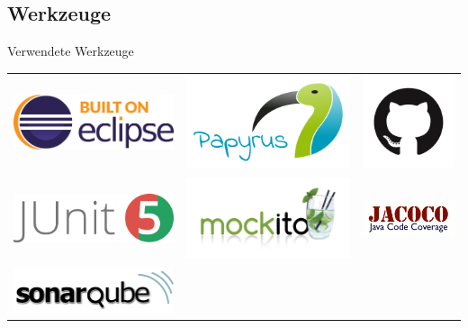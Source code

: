 \documentclass[18pt]{beamer}
\begin{document}
\subsection{Werkzeuge}
\begin{frame}{Verwendete Werkzeuge}
	\begin{tabular}{ccc}
		\includegraphics[width=0.3\linewidth, height=0.3\textheight, keepaspectratio]{bilder/eclipse.png} &
		\includegraphics[width=0.3\linewidth, height=0.3\textheight, keepaspectratio]{bilder/papyrus.png} &
		\includegraphics[width=0.3\linewidth, height=0.3\textheight, keepaspectratio]{bilder/github.png}\\
		\includegraphics[width=0.3\linewidth, height=0.3\textheight, keepaspectratio]{bilder/junit.png} &
		\includegraphics[width=0.3\linewidth, height=0.3\textheight, keepaspectratio]{bilder/mockito.png} &
		\includegraphics[width=0.3\linewidth, height=0.3\textheight, keepaspectratio]{bilder/jacoco_logo.png} \\
		\includegraphics[width=0.3\linewidth, height=0.3\textheight, keepaspectratio]{bilder/sonarqube.png}&

\end{tabular}
\end{frame}
\end{document}

